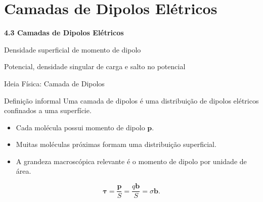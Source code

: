 \documentclass[aspectratio=169]{beamer}
\begin{document}
\section{Camadas de Dipolos Elétricos}

\begin{frame}

\vspace{1.8cm}

\begin{center}
{\color{white}\Huge \textbf{4.3 Camadas de Dipolos Elétricos}}

\vspace{0.5cm}

{\color{white}\Large Densidade superficial de momento de dipolo}

\vspace{1.0cm}

{\color{white}\large Potencial, densidade singular de carga e salto no potencial}
\end{center}

\end{frame}

\begin{frame}{Ideia Física: Camada de Dipolos}

\begin{mybox}{Definição informal}
Uma camada de dipolos é uma distribuição de dipolos elétricos confinados a uma superfície.
\end{mybox}

\begin{itemize}
\item Cada molécula possui momento de dipolo \(\mathbf p\).
\item Muitas moléculas próximas formam uma distribuição superficial.
\item A grandeza macroscópica relevante é o momento de dipolo por unidade de área.
\end{itemize}

\begin{eqbox}
\begin{equation}
\boldsymbol{\tau}
=
\frac{\mathbf p}{S}
=
\frac{q\mathbf b}{S}
=
\sigma \mathbf b .
\tag{4.33}
\label{eq:4.33}
\end{equation}
\end{eqbox}

\end{frame}
\end{document}
